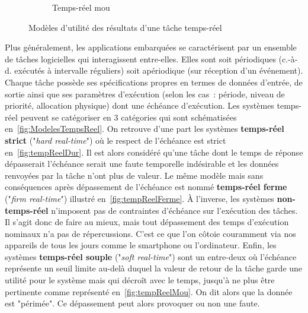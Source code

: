 \documentclass[french, a4paper, 11pt, twoside, pdftex]{StyleThese}
\begin{document}
\begin{figure}[ht]
\begin{subfigure}{.3\textwidth}
				\caption[]{Temps-réel mou}
				\label{fig:tempReelMou}
			\end{subfigure}
			\caption{Modèles d'utilité des résultats d'une tâche temps-réel}
			\label{fig:ModelesTempsReel}
		\end{figure}
		
		Plus généralement, les applications embarquées se caractérisent par un ensemble de tâches logicielles qui interagissent entre-elles. Elles sont soit périodiques (c.-à-d. exécutés à intervalle réguliers) soit apériodique (sur réception d'un événement). Chaque tâche possède ses spécifications propres en termes de données d'entrée, de sortie ainsi que ses paramètres d'exécution (selon les cas : période, niveau de priorité, allocation physique) dont une échéance d'exécution. Les systèmes temps-réel peuvent se catégoriser en 3 catégories qui sont schématisées en~\autoref{fig:ModelesTempsReel}. On retrouve d'une part les systèmes \textbf{temps-réel strict} ("\textit{hard real-time}") où le respect de l'échéance est strict en~\autoref{fig:tempReelDur}. Il est alors considéré qu'une tâche dont le temps de réponse dépasserait l'échéance serait une faute temporelle indésirable et les données renvoyées par la tâche n'ont plus de valeur. Le même modèle mais sans conséquences après dépassement de l'échéance est nommé \textbf{temps-réel ferme} ("\textit{firm real-time}") illustré en~\autoref{fig:tempReelFerme}. À l'inverse, les systèmes \textbf{non-temps-réel} n'imposent pas de contraintes d'échéance sur l'exécution des tâches. Il s'agit donc de faire au mieux, mais tout dépassement des temps d'exécution nominaux n'a pas de répercussions. C'est ce que l'on côtoie couramment via nos appareils de tous les jours comme le smartphone ou l'ordinateur. Enfin, les systèmes \textbf{temps-réel souple} ("\textit{soft real-time}") sont un entre-deux où l'échéance représente un seuil limite au-delà duquel la valeur de retour de la tâche garde une utilité pour le système mais qui décroît avec le temps, jusqu'à ne plus être pertinente comme représenté en~\autoref{fig:tempReelMou}. On dit alors que la donnée est "périmée". Ce dépassement peut alors provoquer ou non une faute.
		
\end{document}
